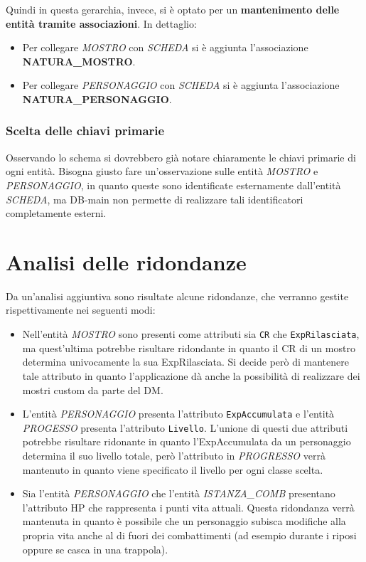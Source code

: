 \documentclass[a4paper,12pt]{report}
\begin{document}
Quindi in questa gerarchia, invece, si è optato per un \textbf{mantenimento delle entità tramite associazioni}. In dettaglio:
\begin{itemize}
    \item Per collegare \textit{MOSTRO} con \textit{SCHEDA} si è aggiunta l'associazione \\ \textbf{NATURA\_MOSTRO}.
    \item Per collegare \textit{PERSONAGGIO} con \textit{SCHEDA} si è aggiunta l'associazione \\ \textbf{NATURA\_PERSONAGGIO}.
\end{itemize}

\subsubsection{Scelta delle chiavi primarie}
Osservando lo schema si dovrebbero già notare chiaramente le chiavi primarie di ogni entità.
Bisogna giusto fare un'osservazione sulle entità \textit{MOSTRO} e \textit{PERSONAGGIO}, in quanto queste sono identificate esternamente dall'entità \textit{SCHEDA}, ma DB-main non permette di realizzare tali identificatori completamente esterni.

\section{Analisi delle ridondanze}
Da un'analisi aggiuntiva sono risultate alcune ridondanze, che verranno gestite rispettivamente nei seguenti modi:
\begin{itemize}
    \item Nell'entità \textit{MOSTRO} sono presenti come attributi sia \texttt{CR} che \texttt{ExpRilasciata}, ma quest'ultima potrebbe risultare ridondante in quanto il CR di un mostro determina univocamente la sua ExpRilasciata. Si decide però di mantenere tale attributo in quanto l'applicazione dà anche la possibilità di realizzare dei mostri custom da parte del DM.
    \item L'entità \textit{PERSONAGGIO} presenta l'attributo \texttt{ExpAccumulata} e l'entità \textit{PROGESSO} presenta l'attributo \texttt{Livello}. L'unione di questi due attributi potrebbe risultare ridonante in quanto l'ExpAccumulata da un personaggio determina il suo livello totale, però l'attributo in \textit{PROGRESSO} verrà mantenuto in quanto viene specificato il livello per ogni classe scelta.
    \item Sia l'entità \textit{PERSONAGGIO} che l'entità \textit{ISTANZA\_COMB} presentano l'attributo HP che rappresenta i punti vita attuali. Questa ridondanza verrà mantenuta in quanto è possibile che un personaggio subisca modifiche alla propria vita anche al di fuori dei combattimenti (ad esempio durante i riposi oppure se casca in una trappola).
\end{itemize}
\end{document}
